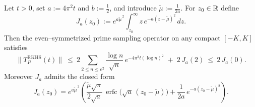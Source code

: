 \begin{lemma}\label{pm:lem:trace-cap-erfc}
Let $t>0$, set $a:=4\pi^2 t$ and $b:=\tfrac12$, and introduce $\widetilde{\mu}:=\frac{1}{2a}$. For $z_0\in\mathbb R$ define
\begin{equation}\label{eq:Prime_norm_leq_rho-formula}
  J_a(z_0) := e^{a \widetilde{\mu}^{\,2}} \int_{z_0}^{\infty} z\,e^{-a (z-\widetilde{\mu})^2}\,dz.
\end{equation}
Then the even--symmetrized prime sampling operator on any compact $[-K,K]$ satisfies
\begin{equation}\label{eq:Prime_norm_leq_rho-formula-6}
  \|T_P^{\mathrm{RKHS}}(t)\|\ \le\ 2\sum_{2\le n\le e^2}\frac{\log n}{\sqrt{n}}\,e^{-4\pi^2 t(\log n)^2}
  \; +\; 2\,J_a(2)\ \le\ 2\,J_a(0).
\end{equation}
Moreover $J_a$ admits the closed form
\begin{equation}\label{eq:J-closed-form}
  J_a(z_0)
  = e^{a\widetilde{\mu}^{\,2}}
    \left(
      \frac{\widetilde{\mu}\sqrt{\pi}}{2\sqrt{a}}\,
        \operatorname{erfc}\!\bigl(\sqrt{a}\,(z_0-\widetilde{\mu})\bigr)
      + \frac{1}{2a}\,e^{-a (z_0-\widetilde{\mu})^2}
    \right).
\end{equation}
\end{lemma}

